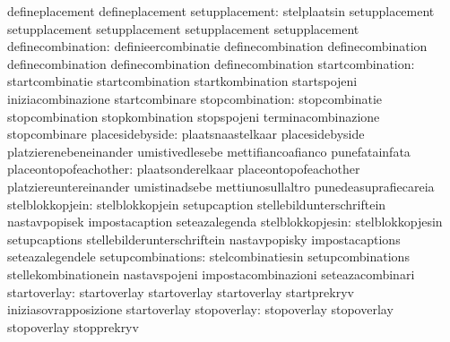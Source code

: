                  defineplacement                  defineplacement
 setupplacement: stelplaatsin                     setupplacement
                 setupplacement                   setupplacement
                 setupplacement                   setupplacement
               definecombination: definieercombinatie              definecombination
                                  definecombination                definecombination
                                  definecombination                definecombination
                startcombination: startcombinatie                  startcombination
                                  startkombination                 startspojeni
                                  iniziacombinazione               startcombinare
                 stopcombination: stopcombinatie                   stopcombination
                                  stopkombination                  stopspojeni
                                  terminacombinazione              stopcombinare
                 placesidebyside: plaatsnaastelkaar                placesidebyside
                                  platzierenebeneinander           umistivedlesebe
                                  mettifiancoafianco               punefatainfata
           placeontopofeachother: plaatsonderelkaar                placeontopofeachother
                                  platziereuntereinander           umistinadsebe
                                  mettiunosullaltro                punedeasuprafiecareia
                 stelblokkopjein: stelblokkopjein                  setupcaption
                                  stellebildunterschriftein        nastavpopisek
                                  impostacaption                   seteazalegenda %
                stelblokkopjesin: stelblokkopjesin                 setupcaptions
                                  stellebilderunterschriftein      nastavpopisky
                                  impostacaptions                  seteazalegendele %
               setupcombinations: stelcombinatiesin                setupcombinations
                                  stellekombinationein             nastavspojeni
                                  impostacombinazioni              seteazacombinari
                    startoverlay: startoverlay                     startoverlay
                                  startoverlay                     startprekryv
                                  iniziasovrapposizione            startoverlay
                     stopoverlay: stopoverlay                      stopoverlay
                                  stopoverlay                      stopprekryv
